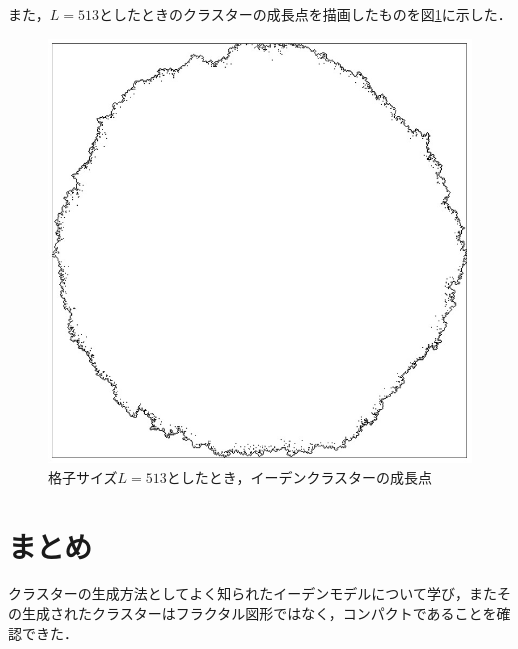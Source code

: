 \documentclass{jsarticle}
\begin{document}
\begin{enumerate}
\begin{enumerate}
                また，$L=513$としたときのクラスターの成長点を描画したものを図\ref{fig:14-6-f5}に示した．
                
                \begin{figure}[H]
                    \begin{center}
                        \includegraphics[scale=0.5]{figure_4.jpg}
                        \caption{格子サイズ$L=513$としたとき，イーデンクラスターの成長点}
                        \label{fig:14-6-f5}
                    \end{center}
                \end{figure}
            \end{enumerate} 
        
    \end{enumerate}

\section{まとめ}
    クラスターの生成方法としてよく知られたイーデンモデルについて学び，またその生成されたクラスターはフラクタル図形ではなく，コンパクトであることを確認できた．
\nocite{textbook}

\end{document}
